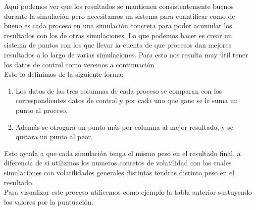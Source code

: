 \documentclass[12pt,a4paper]{article}
\begin{document}
	Aquí podemos ver que los resultados se mantienen consistentemente buenos durante la simulación pero necesitamos un sistema para cuantificar como de bueno es cada proceso en una simulación concreta para poder acumular los resultados con los de otras simulaciones. Lo que podemos hacer es crear un sistema de puntos con los que llevar la cuenta de que procesos dan mejores resultados a lo largo de varias simulaciones. Para esto nos resulta muy útil tener los datos de control como veremos a continuación\\
	Esto lo definimos de la siguiente forma:\\
	\begin{enumerate}
			\item Los datos de las tres columnas de cada proceso se comparan con los correspondientes datos de control y por cada uno que gane se le suma un punto al proceso.
			\item Además se otrogará un punto más por columna al mejor resultado, y se quitara un punto al peor.
	\end{enumerate}
	Esto ayuda a que cada simulación tenga el mismo peso en el resultado final, a diferencia de si utilizmos los numeros conretos de volatilidad con los cuales simulaciones con volatilidades generales distintas tendras distinto peso en el resultado.\\
	Para visualizar este proceso utilicemos como ejemplo la tabla anterior sustuyendo los valores por la puntuación.\\
\end{document}
